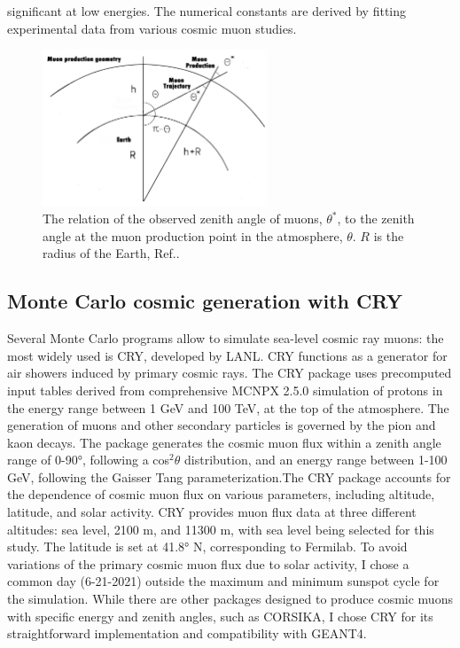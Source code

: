 significant at low energies. The numerical constants are derived by fitting experimental data from various cosmic muon studies.
\begin{figure}[!h]
    \centering
    \includegraphics[width =0.6\textwidth]{figures/png/Screenshot_20240526_140716.png}
    \caption[The relation of $\theta^*$ to $\theta$.]{The relation of the observed zenith angle of muons, $\theta^*$, to 
    the zenith angle at the muon production point in the atmosphere, $\theta$. 
    $R$ is the radius of the Earth, Ref.\cite{guan2015parametrization}.}
    \label{fig:anglesinmuon}
\end{figure}

\subsection{Monte Carlo cosmic generation with CRY}
Several Monte Carlo programs allow to simulate sea-level 
cosmic ray muons: the most widely used is CRY, developed 
by LANL. CRY functions as a generator for air showers 
induced by primary cosmic rays. The CRY package uses 
precomputed input tables derived from comprehensive 
MCNPX 2.5.0 simulation of protons in the energy range 
between 1 GeV and 100 TeV, at the top of the atmosphere.
The generation of muons and other secondary particles 
is governed by the pion and kaon decays. The package 
generates the cosmic muon flux within a zenith angle range 
of 0-90°, following a cos$^2 \theta$ distribution, and an 
energy range between 1-100 GeV, following the Gaisser 
Tang parameterization.The CRY package accounts for the 
dependence of cosmic muon flux on various parameters, 
including altitude, latitude, and solar activity. CRY 
provides muon flux data at three different altitudes: 
sea level, 2100 m, and 11300 m, with sea level being 
selected for this study. The latitude is set at 41.8° N, 
corresponding to Fermilab. To avoid variations of the 
primary cosmic muon flux due to solar activity, I chose 
a common day (6-21-2021) outside the maximum and minimum 
sunspot cycle for the simulation. While there are other 
packages designed to produce cosmic muons with specific 
energy and zenith angles, such as CORSIKA, I chose CRY 
for its straightforward implementation and compatibility with GEANT4. 


